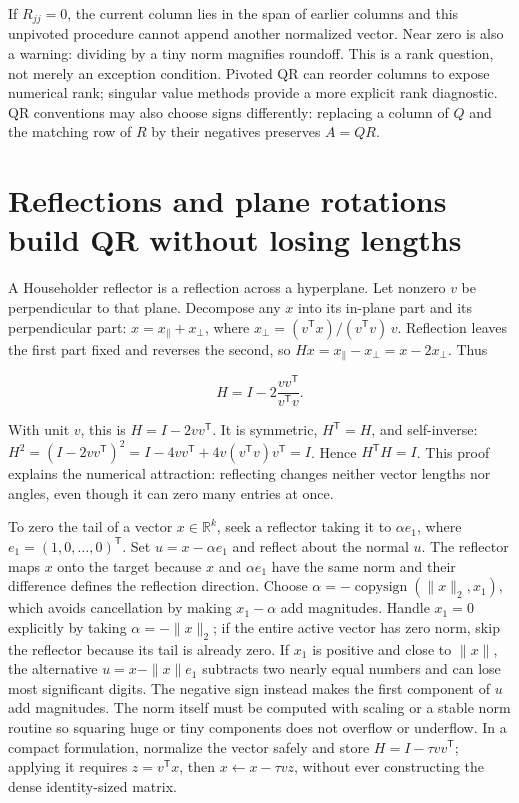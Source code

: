 If \(R_{jj}=0\), the current column lies in the span of earlier columns and this unpivoted procedure cannot append another normalized vector. Near zero is also a warning: dividing by a tiny norm magnifies roundoff. This is a rank question, not merely an exception condition. Pivoted QR can reorder columns to expose numerical rank; singular value methods provide a more explicit rank diagnostic. QR conventions may also choose signs differently: replacing a column of \(Q\) and the matching row of \(R\) by their negatives preserves \(A=QR\).

\section{Reflections and plane rotations build QR without losing lengths}\label{01-foundations-i-ch020-reflections-and-plane-rotations-build-qr-without-losing-lengths}

A Householder reflector is a reflection across a hyperplane. Let nonzero \(v\) be perpendicular to that plane. Decompose any \(x\) into its in-plane part and its perpendicular part: \(x=x_\parallel+x_\perp\), where \(x_\perp=(v^\mathsf Tx)/(v^\mathsf Tv)\,v\). Reflection leaves the first part fixed and reverses the second, so \(Hx=x_\parallel-x_\perp=x-2x_\perp\). Thus

\[
H=I-2\frac{vv^\mathsf T}{v^\mathsf Tv}.
\]

With unit \(v\), this is \(H=I-2vv^\mathsf T\). It is symmetric, \(H^\mathsf T=H\), and self-inverse: \(H^2=(I-2vv^\mathsf T)^2=I-4vv^\mathsf T+4v(v^\mathsf Tv)v^\mathsf T=I\). Hence \(H^\mathsf TH=I\). This proof explains the numerical attraction: reflecting changes neither vector lengths nor angles, even though it can zero many entries at once.

To zero the tail of a vector \(x\in\mathbb R^k\), seek a reflector taking it to \(\alpha e_1\), where \(e_1=(1,0,\ldots,0)^\mathsf T\). Set \(u=x-\alpha e_1\) and reflect about the normal \(u\). The reflector maps \(x\) onto the target because \(x\) and \(\alpha e_1\) have the same norm and their difference defines the reflection direction. Choose \(\alpha=-\operatorname{copysign}(\|x\|_2,x_1)\), which avoids cancellation by making \(x_1-\alpha\) add magnitudes. Handle \(x_1=0\) explicitly by taking \(\alpha=-\|x\|_2\); if the entire active vector has zero norm, skip the reflector because its tail is already zero. If \(x_1\) is positive and close to \(\|x\|\), the alternative \(u=x-\|x\|e_1\) subtracts two nearly equal numbers and can lose most significant digits. The negative sign instead makes the first component of \(u\) add magnitudes. The norm itself must be computed with scaling or a stable norm routine so squaring huge or tiny components does not overflow or underflow. In a compact formulation, normalize the vector safely and store \(H=I-\tau v v^\mathsf T\); applying it requires \(z=v^\mathsf Tx\), then \(x\leftarrow x-\tau vz\), without ever constructing the dense identity-sized matrix.

